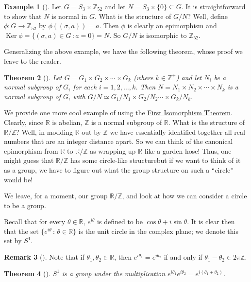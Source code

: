 \documentclass[10pt,]{book}
\theoremstyle{plain}
\newtheorem{theorem}{Theorem}[section]
\theoremstyle{definition}
\theoremstyle{definition}
\newtheorem{remark}[theorem]{Remark}
\theoremstyle{definition}
\newtheorem{example}[theorem]{Example}
\theoremstyle{definition}
\numberwithin{equation}{section}
\def\Z{\mathbb{Z}}
\def\R{\mathbb{R}}
\DeclareMathOperator{\Ker}{Ker}
\begin{document}
\begin{example}[]\label{example-87}
Let \(G=S_3\times \Z_{52}\) and let \(N=S_3 \times
\{0\}\subseteq G\). It is straightforward to show that \(N\) is normal in \(G\). What is the structure of \(G/N\)? Well, define \(\phi:G\to
\Z_{52}\) by \(\phi((\sigma, a))=a\). Then \(\phi\) is clearly an epimorphism and \(\Ker \phi=\{(\sigma,a)\in G\,:a=0\}=N\). So \(G/N\) is isomorphic to \(\Z_{52}\).%
\end{example}
Generalizing the above example, we have the following theorem, whose proof we leave to the reader.%
\begin{theorem}[{}]\label{theorem-63}
Let \(G=G_1\times G_2 \times \cdots \times G_k\) (where \(k\in \Z^+\)) and let \(N_i\) be a normal subgroup of \(G_i\) for each \(i=1,2,\ldots, k\). Then \(N=N_1 \times N_2 \times \cdots \times N_k\) is a normal subgroup of \(G\), with \(G/N \simeq G_1/N_1 \times G_2/N_2
\cdots \times G_k/N_k.\)%
\end{theorem}
We provide one more cool example of using the \hyperref[fit]{First Isomorphism Theorem}. Clearly, since \(\R\) is abelian, \(\Z\) is a normal subgroup of \(\R\). What is the structure of \(\R/\Z\)? Well, in modding \(\R\) out by \(\Z\) we have essentially identified together all real numbers that are an integer distance apart. So we can think of the canonical epimorphism from \(\R\) to \(\R/\Z\) as wrapping up \(\R\) like a garden hose! Thus, one might guess that \(\R/\Z\) has some circle-like structure\textemdash{}but if we want to think of it as a group, we have to figure out what the group structure on such a ``circle'' would be!%
\par
We leave, for a moment, our group \(\R/\Z\), and look at how we can consider a circle to be a group.%
\par
Recall that for every \(\theta \in \R\), \(e^{i\theta}\) is defined to be \(\cos \theta + i\sin \theta\). It is clear then that the set \(\{e^{i\theta} \,:\, \theta\in
\R\}\) is the unit circle in the complex plane; we denote this set by \(S^1\).%
\label{notation-43}
\begin{remark}[]\label{remark-42}
Note that if \(\theta_1, \theta_2\in \R\), then \(e^{i\theta_1}=e^{i\theta_2}\) if and only if \(\theta_1-\theta_2
\in 2\pi \Z\).%
\end{remark}
\begin{theorem}[{}]\label{theorem-64}
\(S^1\) is a group under the multiplication \(e^{i\theta_1}e^{i\theta_2}=e^{i(\theta_1+\theta_2)}\).%
\end{theorem}
\end{document}
